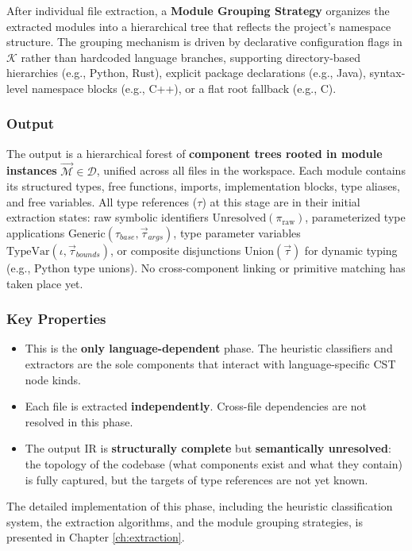 After individual file extraction, a \textbf{Module Grouping Strategy}
organizes the extracted modules into a hierarchical tree that reflects the
project's namespace structure. The grouping mechanism is driven by declarative
configuration flags in $\mathcal{K}$ rather than hardcoded language branches,
supporting directory-based hierarchies (e.g., Python, Rust), explicit package
declarations (e.g., Java), syntax-level namespace blocks (e.g., C++), or a
flat root fallback (e.g., C).

\subsubsection{Output}

The output is a hierarchical forest of \textbf{component trees rooted
in module instances} $\vec{\mathcal{M}} \in \mathcal{D}$,
unified across all files in the workspace. Each module contains its
structured types, free functions, imports, implementation blocks,
type aliases, and free variables. All type references ($\tau$) at
this stage are in their initial extraction states:
raw symbolic identifiers $\text{Unresolved}(\pi_{\text{raw}})$,
parameterized type applications $\text{Generic}(\tau_{base},
\vec{\tau}_{args})$,
type parameter variables $\text{TypeVar}(\iota, \vec{\tau}_{bounds})$,
or composite
disjunctions $\text{Union}(\vec{\tau})$ for dynamic typing (e.g.,
Python type unions).
No cross-component linking or primitive matching has taken place yet.

\subsubsection{Key Properties}
\begin{itemize}
  \item This is the \textbf{only language-dependent} phase. The
    heuristic classifiers and extractors are the sole components that
    interact with language-specific CST node kinds.
  \item Each file is extracted \textbf{independently}. Cross-file
    dependencies are not resolved in this phase.
  \item The output IR is \textbf{structurally complete} but
    \textbf{semantically unresolved}: the topology of the codebase
    (what components exist and what they contain) is fully captured,
    but the targets of type references are not yet known.
\end{itemize}

The detailed implementation of this phase, including the heuristic
classification system, the extraction algorithms, and the module
grouping strategies, is presented in Chapter \ref{ch:extraction}.

